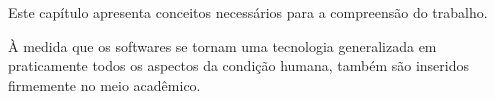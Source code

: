 
{Este capítulo apresenta conceitos necessários para a compreensão do trabalho.}
\label{fundamentacao}

À medida que os softwares se tornam uma tecnologia generalizada em praticamente
todos os aspectos da condição humana, também são inseridos firmemente no meio
acadêmico.






